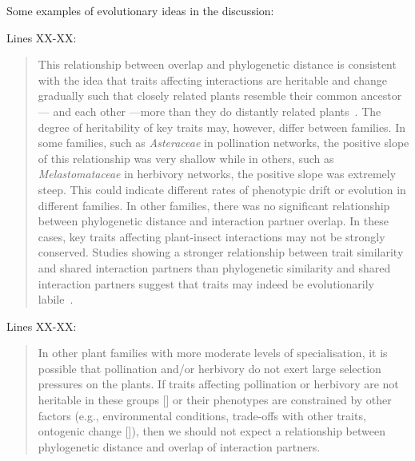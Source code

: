 \documentclass[12pt]{letter}
\begin{document}
		Some examples of evolutionary ideas in the discussion:


		Lines XX-XX:

		\begin{quotation}

			This relationship between overlap and 
			phylogenetic distance is consistent with the idea that traits affecting 
			interactions are heritable and change gradually
			such that closely related plants resemble their common ancestor--- and
			  each other ---more than they do distantly related 
			  plants~\citep{Schemske1999,Gilbert2015,Ponisio2017}. The degree of 
			  heritability of key traits may, however, differ between families. In
			  some families, such as \emph{Asteraceae} in pollination networks, 
			  the positive slope of this relationship was very shallow while in 
			  others, such as \emph{Melastomataceae} in herbivory networks, the 
			  positive slope was extremely steep. This could indicate different 
			  rates of phenotypic drift or evolution in different families. 
			  In other families, there was no significant relationship between phylogenetic
			  distance and interaction partner overlap. In these cases, key traits affecting 
			  plant-insect interactions may not be strongly
			  conserved. Studies showing a stronger relationship between trait similarity
			  and shared interaction partners than phylogenetic similarity and shared
			  interaction partners suggest that traits may indeed be evolutionarily
			  labile~\citep{Junker2015,Ibanez2016,Endara2017}. 

		\end{quotation}



		Lines XX-XX:

		\begin{quotation}

			In other plant families
			  with more moderate levels of specialisation, it is possible 
			  that pollination and/or herbivory do not exert large
			  selection pressures on the plants. If traits affecting pollination
			  or herbivory are not heritable in these groups [\citealp{Kursar2009}] 
			  or their phenotypes are constrained by other factors (e.g., 
			  environmental conditions, trade-offs with other traits, ontogenic
			  change [\citealp{Karinho2014}]), then we should not expect a relationship 
			  between phylogenetic distance and overlap of interaction partners.

		\end{quotation}
\end{document}
